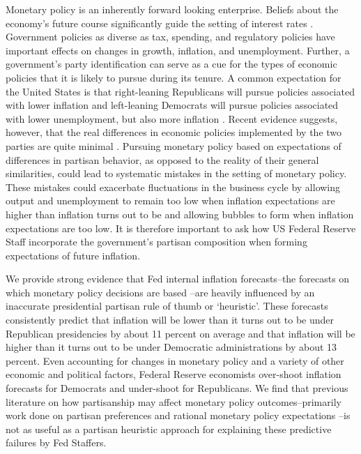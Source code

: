 \documentclass[a4paper]{article}
\begin{document}
Monetary policy is an inherently forward looking enterprise. Beliefs about the economy's future course significantly guide the setting of interest rates \citep[59]{Goodhart2001}. Government policies as diverse as tax, spending, and regulatory policies have important effects on changes in growth, inflation, and unemployment. Further, a government's party identification can serve as a cue for the types of economic policies that it is likely to pursue during its tenure. A common expectation for the United States is that right-leaning Republicans will pursue policies associated with lower inflation and left-leaning Democrats will pursue policies associated with lower unemployment, but also more inflation \cite[see][]{Samuelson1977,HibbsJr1977}. Recent evidence suggests, however, that the real differences in economic policies implemented by the two parties are quite minimal \citep{Bartels2008}. Pursuing monetary policy based on expectations of differences in partisan behavior, as opposed to the reality of their general similarities, could lead to systematic mistakes in the setting of monetary policy. These mistakes could exacerbate fluctuations in the business cycle by allowing output and unemployment to remain too low when inflation expectations are higher than inflation turns out to be and allowing bubbles to form when inflation expectations are too low. It is therefore important to ask how US Federal Reserve Staff incorporate the government's partisan composition when forming expectations of future inflation.

We provide strong evidence that Fed internal inflation forecasts--the forecasts on which monetary policy decisions are based \citep[130]{Adolph2013}--are heavily influenced by an inaccurate presidential partisan rule of thumb or `heuristic'. These forecasts consistently predict that inflation will be lower than it turns out to be under Republican presidencies by about 11 percent on average and that inflation will be higher than it turns out to be under Democratic administrations by about 13 percent. Even accounting for changes in monetary policy and a variety of other economic and political factors, Federal Reserve economists over-shoot inflation forecasts for Democrats and under-shoot for Republicans. We find that previous literature on how partisanship may affect monetary policy outcomes--primarily work done on partisan preferences \citep{Clark2012,Hakes1988,Sieg1997,Tootell1996} and rational monetary policy expectations \citep{Alesina1987,Alesina1991,Hibbs1994}--is not as useful as a partisan heuristic approach for explaining these predictive failures by Fed Staffers.
\end{document}

